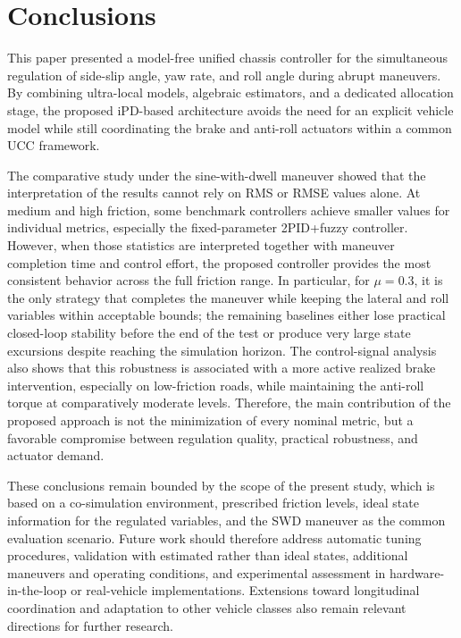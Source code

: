 \documentclass[sn-chicago,iicol]{sn-jnl}
\theoremstyle{thmstyleone}%
\theoremstyle{thmstyletwo}%
\theoremstyle{thmstylethree}%
\begin{document}
\section{Conclusions} \label{sec:concl}




This paper presented a model-free unified chassis controller for the simultaneous regulation of side-slip angle, yaw rate, and roll angle during abrupt maneuvers. By combining ultra-local models, algebraic estimators, and a dedicated allocation stage, the proposed iPD-based architecture avoids the need for an explicit vehicle model while still coordinating the brake and anti-roll actuators within a common UCC framework.

The comparative study under the sine-with-dwell maneuver showed that the interpretation of the results cannot rely on RMS or RMSE values alone. At medium and high friction, some benchmark controllers achieve smaller values for individual metrics, especially the fixed-parameter 2PID+fuzzy controller. However, when those statistics are interpreted together with maneuver completion time and control effort, the proposed controller provides the most consistent behavior across the full friction range. In particular, for $\mu = 0.3$, it is the only strategy that completes the maneuver while keeping the lateral and roll variables within acceptable bounds; the remaining baselines either lose practical closed-loop stability before the end of the test or produce very large state excursions despite reaching the simulation horizon. The control-signal analysis also shows that this robustness is associated with a more active realized brake intervention, especially on low-friction roads, while maintaining the anti-roll torque at comparatively moderate levels. Therefore, the main contribution of the proposed approach is not the minimization of every nominal metric, but a favorable compromise between regulation quality, practical robustness, and actuator demand.

These conclusions remain bounded by the scope of the present study, which is based on a co-simulation environment, prescribed friction levels, ideal state information for the regulated variables, and the SWD maneuver as the common evaluation scenario. Future work should therefore address automatic tuning procedures, validation with estimated rather than ideal states, additional maneuvers and operating conditions, and experimental assessment in hardware-in-the-loop or real-vehicle implementations. Extensions toward longitudinal coordination and adaptation to other vehicle classes also remain relevant directions for further research.
\end{document}
